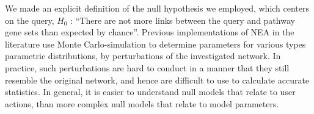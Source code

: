 \documentclass[a4paper,american]{lipics-v2016}
\begin{document}
We made an explicit definition of the null hypothesis we employed, which centers on the query, $H_0$ : ``There are not more links between the query and pathway gene sets than expected by chance''. Previous implementations of NEA in the literature use Monte Carlo-simulation to determine parameters for various types parametric distributions, by perturbations of the investigated network. In practice, such perturbations are hard to conduct in a manner that they still resemble the original network, and hence are difficult to use to calculate accurate statistics. In general, it is easier to understand null models that relate to user actions, than more complex null models that relate to model parameters.


\end{document}
